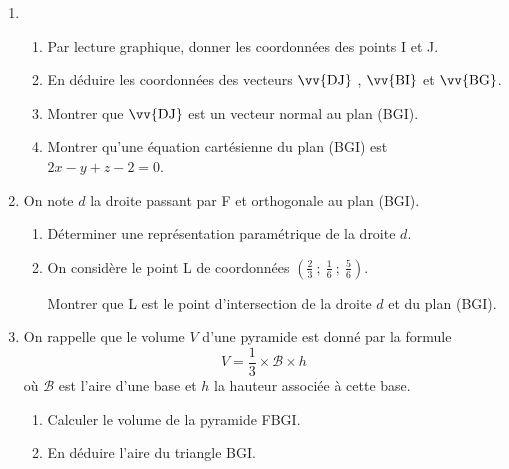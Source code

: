 \begin{enumerate}
\item 
	\begin{enumerate}
		\item Par lecture graphique, donner les coordonnées des points I et J.
		\item En déduire les coordonnées des vecteurs $\vv{\text{DJ}}$ , $\vv{\text{BI}}$ et $\vv{\text{BG}}$.
		\item Montrer que $\vv{\text{DJ}}$ est un vecteur normal au plan (BGI).
		\item Montrer qu’une équation cartésienne du plan (BGI) est $2x - y + z - 2 = 0$.
	\end{enumerate}
\item On note $d$ la droite passant par F et orthogonale au plan (BGI).
	\begin{enumerate}
		\item Déterminer une représentation paramétrique de la droite $d$.
		\item On considère le point L de coordonnées $\left(\frac{2}{3}~;~\frac{1}{6}~;~\frac{5}{6}\right)$.

Montrer que L est le point d’intersection de la droite $d$ et du plan (BGI).
	\end{enumerate}
\item On rappelle que le volume $V$ d'une pyramide est donné par la formule
\[V=\dfrac{1}{3}\times \mathcal{B}\times h\]
où $\mathcal{B}$ est l'aire d’une base et $h$ la hauteur associée à cette base.
\begin{enumerate}
\item Calculer le volume de la pyramide FBGI.
\item En déduire l'aire du triangle BGI.
\end{enumerate}
\end{enumerate}

\bigskip

